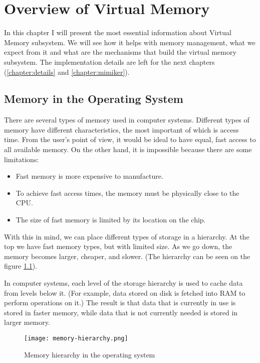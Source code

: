 \chapter{Overview of Virtual Memory}
\label{chapter:vm_overview}

In this chapter I will present the most essential information about Virtual Memory subsystem.
We will see how it helps with memory management, what we expect from it and what are the mechanisms that build the virtual memory subsystem.
The implementation details are left for the next chapters (\ref{chapter:details} and \ref{chapter:mimiker}).

\section{Memory in the Operating System}

There are several types of memory used in computer systems.
Different types of memory have different characteristics, the most important of which is access time.
From the user's point of view, it would be ideal to have equal, fast access to all available memory.
On the other hand, it is impossible because there are some limitations:
\begin{itemize}
  \item Fast memory is more expensive to manufacture.
  \item To achieve fast access times, the memory must be physically close to the CPU.
  \item The size of fast memory is limited by its location on the chip.
\end{itemize}

With this in mind, we can place different types of storage in a hierarchy.
At the top we have fast memory types, but with limited size.
As we go down, the memory becomes larger, cheaper, and slower.
(The hierarchy can be seen on the figure \ref{fig:memory_hierarchy}).

In computer systems, each level of the storage hierarchy is used to cache data from levels below it.
(For example, data stored on disk is fetched into RAM to perform operations on it.)
The result is that data that is currently in use is stored in faster memory,
while data that is not currently needed is stored in larger memory.

\begin{figure}[h]
  \centering
  \texttt{[image: memory-hierarchy.png]}
  \caption{Memory hierarchy in the operating system \cite{csapp}}
  \label{fig:memory_hierarchy}
\end{figure}

